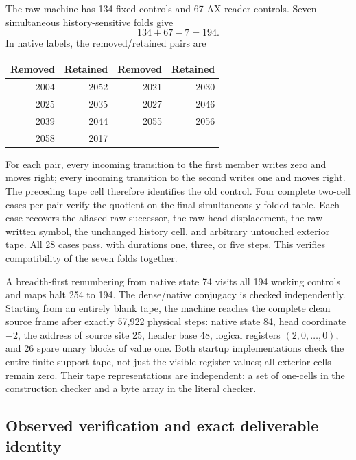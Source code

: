 The raw machine has 134 fixed controls and 67 AX-reader controls.
Seven simultaneous history-sensitive folds give
\[
                         134+67-7=194.
\]
In native labels, the removed/retained pairs are
\begin{center}
\begin{tabular}{rr@{\qquad}rr}
\toprule
Removed&Retained&Removed&Retained\\
\midrule
2004&2052&2021&2030\\
2025&2035&2027&2046\\
2039&2044&2055&2056\\
2058&2017&&\\
\bottomrule
\end{tabular}
\end{center}
For each pair, every incoming transition to the first member writes
zero and moves right; every incoming transition to the second writes
one and moves right. The preceding tape cell therefore identifies the
old control. Four complete two-cell cases per pair verify the quotient
on the final simultaneously folded table. Each case recovers the
aliased raw successor, the raw head displacement, the raw written
symbol, the unchanged history cell, and arbitrary untouched exterior
tape. All 28 cases pass, with durations one, three, or five steps.
This verifies compatibility of the seven folds together.

A breadth-first renumbering from native state 74 visits all 194 working
controls and maps halt 254 to 194. The dense/native conjugacy is checked
independently. Starting from an entirely blank tape, the machine reaches
the complete clean source frame after exactly 57,922 physical steps:
native state 84, head coordinate $-2$, the address of source site 25,
header base 48, logical registers $(2,0,\ldots,0)$, and 26 spare unary
blocks of value one. Both startup implementations check the entire
finite-support tape, not just the visible register values; all exterior
cells remain zero. Their tape representations are independent: a set
of one-cells in the construction checker and a byte array in the literal
checker.

\subsection{Observed verification and exact deliverable identity}

